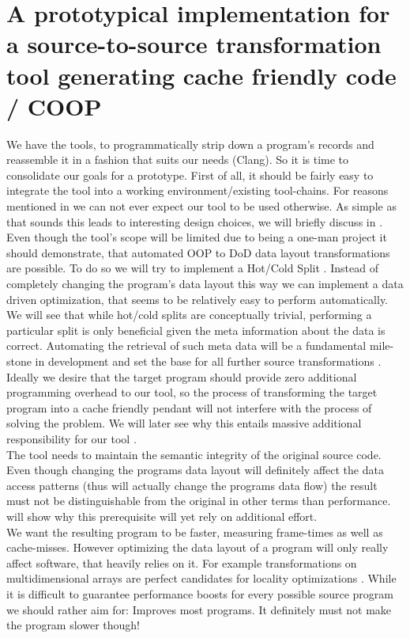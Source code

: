 \chapter{A prototypical implementation for a source-to-source transformation tool generating cache friendly code / COOP}\label{prototype}
We have the tools, to programmatically strip down a program's records and reassemble it in a fashion that suits our needs (Clang). So it is time to consolidate our goals for a prototype. First of all, it should be fairly easy to integrate the tool into a working environment/existing tool-chains. For reasons mentioned in  we can not ever expect our tool to be used otherwise. As simple as that sounds this leads to interesting design choices, we will briefly discuss in .\\
Even though the tool's scope will be limited due to being a one-man project it should demonstrate, that automated OOP to DoD data layout transformations are possible. To do so we will try to implement a Hot/Cold Split . Instead of completely changing the program's data layout this way we can implement a data driven optimization, that seems to be relatively easy to perform automatically. We will see that while hot/cold splits are conceptually trivial, performing a particular split is only beneficial given the meta information about the data is correct. Automating the retrieval of such meta data will be a fundamental mile-stone in development and set the base for all further source transformations .\\
Ideally we desire that the target program should provide zero additional programming overhead to our tool, so the process of transforming the target program into a cache friendly pendant will not interfere with the process of solving the problem. We will later see why this entails massive additional responsibility for our tool .\\
The tool needs to maintain the semantic integrity of the original source code. Even though changing the programs data layout will definitely affect the data access patterns (thus will actually change the programs data flow) the result must not be distinguishable from the original in other terms than performance.  will show why this prerequisite will yet rely on additional effort.\\
We want the resulting program to be faster, measuring frame-times as well as cache-misses. However optimizing the data layout of a program will only really affect software, that heavily relies on it. For example transformations on multidimensional arrays are perfect candidates for locality optimizations . While it is difficult to guarantee performance boosts for every possible source program we should rather aim for: Improves most programs. It definitely must not make the program slower though! 
\newpage
